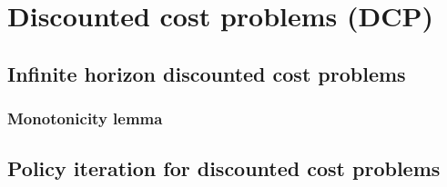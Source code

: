 \section{Discounted cost problems (DCP)}

\subsection{Infinite horizon discounted cost problems}

\subsubsection{Monotonicity lemma}

\subsection{Policy iteration for discounted cost problems}
